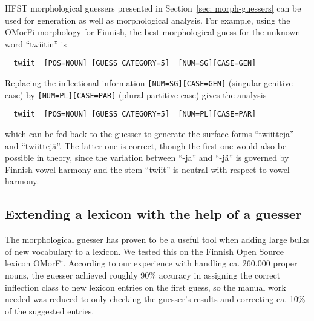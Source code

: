 \documentclass{llncs}
\begin{document}
HFST morphological guessers presented in Section~\ref{sec:
  morph-guessers} can be used for generation as well as morphological
analysis. For example, using the OMorFi morphology for Finnish, the
best morphological guess for the unknown word ``twiitin'' is
\begin{verbatim}
  twiit  [POS=NOUN] [GUESS_CATEGORY=5]  [NUM=SG][CASE=GEN]
\end{verbatim}
Replacing the inflectional information {\tt [NUM=SG][CASE=GEN]}
(singular genitive case) by {\tt [NUM=PL][CASE=PAR]} (plural
partitive case) gives the analysis
\begin{verbatim}
  twiit  [POS=NOUN] [GUESS_CATEGORY=5]  [NUM=PL][CASE=PAR]
\end{verbatim}
which can be fed back to the guesser to generate the surface forms
``twiitteja'' and ``twiittejä''. The latter one is correct, though the
first one would also be possible in theory, since the variation
between ``-ja'' and ``-jä'' is governed by Finnish vowel harmony and
the stem ``twiit'' is neutral with respect to vowel harmony.


\subsection{Extending a lexicon with the help of a guesser}

The morphological guesser has proven to be a useful tool when adding 
large bulks of new vocabulary to a lexicon. We tested this on the Finnish Open Source
lexicon OMorFi. According to our experience with handling ca. 260.000 proper nouns, the guesser achieved
roughly 90\% accuracy in assigning the correct inflection class to new
lexicon entries on the first guess, so the manual work needed was reduced to only
checking the guesser's results and correcting ca. 10\% of the suggested
entries. 
\end{document}
